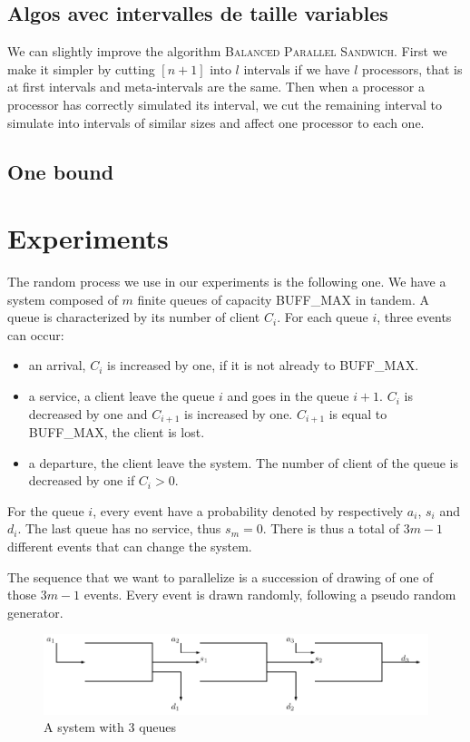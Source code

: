 \documentclass[a4paper,10pt]{article}
\begin{document}
\subsection{Algos avec intervalles de taille variables}


We can slightly improve the algorithm \textsc{Balanced Parallel Sandwich}.
First we make it simpler by cutting $[n+1]$ into $l$ intervals if we have $l$
processors, that is at first intervals and meta-intervals are the same. Then when a processor
a processor has correctly simulated its interval, we cut the remaining interval to simulate into 
intervals of similar sizes and affect one processor to each one.

\subsection{One bound}


\section{Experiments}

The random process we use in our experiments is the following one. We have a system composed of $m$ finite queues of capacity BUFF\_MAX in tandem. A queue is characterized by its number of client $C_i$.  For each queue $i$, three events can occur:
\begin{itemize}
\item an arrival, $C_i$ is increased by one, if it is not already to BUFF\_MAX.
\item a service, a client leave the queue $i$ and goes in the queue $i+1$. $C_i$ is decreased by one and $C_{i+1}$ is increased by one. $C_{i+1}$ is equal to BUFF\_MAX, the client is lost.
\item a departure, the client leave the system. The number of client of the queue is decreased by one if $C_i >0$.
\end{itemize}

For the queue $i$, every event have a probability denoted by respectively $a_i$, $s_i$ and $d_i$. The last queue has no service, thus $s_m = 0 $. There is thus a total of $3m-1$ different events that can change the system.

The sequence that we want to parallelize is a succession of drawing of one of those $3m-1$ events. Every event is drawn randomly, following a pseudo random generator.

\begin{figure}
 \includegraphics[scale=0.75]{figures/tandem.pdf}
 \caption{A system with 3 queues}
\end{figure}
\end{document}
